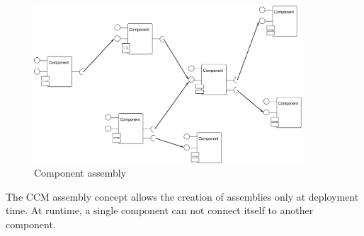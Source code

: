 \begin{figure}[!htb]
    \begin{center}
        \includegraphics [width=10cm,angle=0] {figures/Assembly}
        \caption{Component assembly}
        \label{assemblygraph}
    \end{center}
\end{figure}

\noindent
The CCM assembly concept allows the creation of assemblies only at deployment 
time.
At runtime, a single component can not connect itself to another component.

\newpage